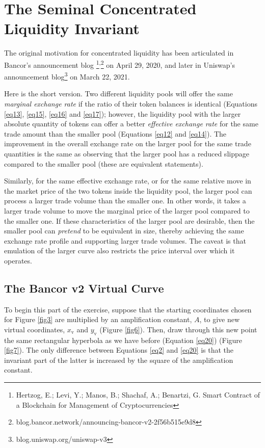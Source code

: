 \documentclass{article}
\begin{document}
\section{The Seminal Concentrated Liquidity Invariant}\label{sec3}

The original motivation for concentrated liquidity has been articulated in Bancor’s announcement blog \footnote{Hertzog, E.; Levi, Y.; Manos, B.; Shachaf, A.; Benartzi, G. Smart Contract of a Blockchain for Management of Cryptocurrencies}\textsuperscript{,}\footnote{blog.bancor.network/announcing-bancor-v2-2f56b515e9d8} on April 29, 2020, and later in Uniswap’s announcement blog\footnote{blog.uniswap.org/uniswap-v3} on March 22, 2021. 

Here is the short version. Two different liquidity pools will offer the same \textit{marginal exchange rate} if the ratio of their token balances is identical (Equations \ref{eq13}, \ref{eq15}, \ref{eq16} and \ref{eq17}); however, the liquidity pool with the larger absolute quantity of tokens can offer a better \textit{effective exchange rate} for the same trade amount than the smaller pool (Equations \ref{eq12} and \ref{eq14}). The improvement in the overall exchange rate on the larger pool for the same trade quantities is the same as observing that the larger pool has a reduced slippage compared to the smaller pool (these are equivalent statements). 

Similarly, for the same effective exchange rate, or for the same relative move in the market price of the two tokens inside the liquidity pool, the larger pool can process a larger trade volume than the smaller one. In other words, it takes a larger trade volume to move the marginal price of the larger pool compared to the smaller one. If these characteristics of the larger pool are desirable, then the smaller pool can \textit{pretend} to be equivalent in size, thereby achieving the same exchange rate profile and supporting larger trade volumes. The caveat is that emulation of the larger curve also restricts the price interval over which it operates.

\subsection{The Bancor v2 Virtual Curve}\label{subsec3.1}

To begin this part of the exercise, suppose that the starting coordinates chosen for Figure \ref{fig3} are multiplied by an amplification constant, $A$, to give new virtual coordinates, $x_{\text{v}}$ and $y_{\text{v}}$ (Figure \ref{fig6}). Then, draw through this new point the same rectangular hyperbola as we have before (Equation \ref{eq20}) (Figure \ref{fig7}). The only difference between Equations \ref{eq2} and \ref{eq20} is that the invariant part of the latter is increased by the square of the amplification constant. 
\end{document}
